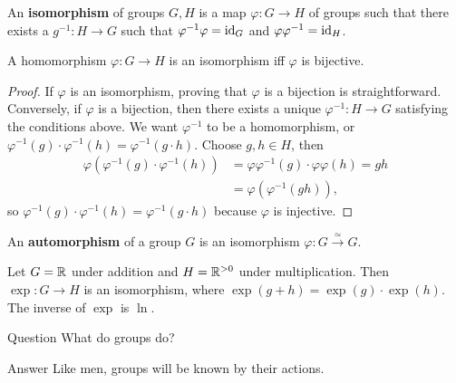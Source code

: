 \begin{definition}[]
    An \textbf{isomorphism} of groups $G,H$ is a map $\varphi  \colon G \to H$ of groups such that there exists a  $g^{-1} \colon H \to G$ such that $\varphi ^{-1} \varphi =\operatorname{id}_G$ and $\varphi  \varphi ^{-1}=\operatorname{id}_H$.
\end{definition}

\begin{lemma}
    A homomorphism $\varphi  \colon G \to H$ is an isomorphism iff $\varphi $ is bijective.
\end{lemma}
\begin{proof}
    If $\varphi $ is an isomorphism, proving that $\varphi $ is a bijection is straightforward. Conversely, if $\varphi $ is a bijection, then there exists a unique $\varphi  ^{-1} \colon H \to G$ satisfying the conditions above. We want $\varphi  ^{-1}$ to be a homomorphism, or $\varphi  ^{-1}(g) \cdot \varphi  ^{-1}(h)=\varphi  ^{-1}(g \cdot h)$. Choose $g,h \in H$, then 
    \begin{align*}
        \varphi (\varphi ^{-1}(g) \cdot \varphi ^{-1}(h))&=\varphi \varphi  ^{-1} (g) \cdot  \varphi  \varphi (h)=gh\\
                                                         &=\varphi (\varphi  ^{-1}(gh)),
    \end{align*}so $\varphi  ^{-1}(g) \cdot \varphi ^{-1}(h) = \varphi ^{-1}(g \cdot h)$ because $\varphi  $ is injective.
\end{proof}

\begin{definition}[]
    An \textbf{automorphism} of a group $G$ is an isomorphism $\varphi  \colon G \xrightarrow{\simeq } G $.
\end{definition}
\begin{example}
    Let $G=\mathbb{R}$ under addition and $H=\mathbb{R}^{>0}$ under multiplication. Then $\exp \colon G \to H$ is an isomorphism, where $\exp(g+h)=\exp(g) \cdot \exp(h)$. The inverse of $\exp$ is $\ln$.
\end{example}
\begin{namedthing}{Question} 
   What do groups do? 
\end{namedthing}
\begin{namedthing}{Answer} 
   Like men, groups will be known by their actions.
\end{namedthing}

